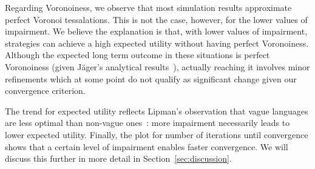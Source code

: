 Regarding Voronoiness, we observe that most simulation results approximate perfect Voronoi tessalations.
This is not the case, however, for the lower values of impairment.
We believe the explanation is that, with lower values of impairment, strategies can achieve a high expected utility without having perfect Voronoiness.
Although the expected long term outcome in these situations is perfect Voronoiness (given J\"ager's analytical results~\cite{Jager2007}), actually reaching it involves minor refinements which at some point do not qualify as significant change given our convergence criterion.

The trend for expected utility reflects Lipman's observation that vague languages are less optimal than non-vague ones~\cite{Lipman2009}: more impairment necessarily leads to lower expected utility.
Finally, the plot for number of iterations until convergence shows that a certain level of impairment enables faster convergence.
We will discuss this further in more detail in Section~\ref{sec:discussion}.






